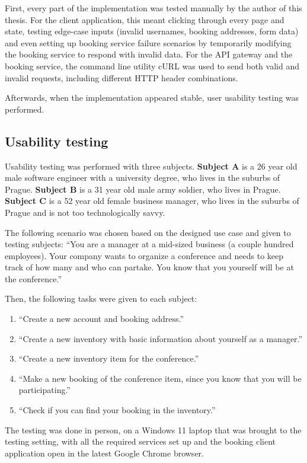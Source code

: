 First, every part of the implementation was tested manually by the author of this thesis. For the client application, this meant clicking through every page and state, testing edge-case inputs (invalid usernames, booking addresses, form data) and even setting up booking service failure scenarios by temporarily modifying the booking service to respond with invalid data. For the API gateway and the booking service, the command line utility cURL was used to send both valid and invalid requests, including different HTTP header combinations.

Afterwards, when the implementation appeared stable, user usability testing was performed. 

\subsection{Usability testing}

Usability testing was performed with three subjects. \textbf{Subject A} is a 26 year old male software engineer with a university degree, who lives in the suburbs of Prague. \textbf{Subject B} is a 31 year old male army soldier, who lives in Prague. \textbf{Subject C} is a 52 year old female business manager, who lives in the suburbs of Prague and is not too technologically savvy.

The following scenario was chosen based on the designed use case and given to testing subjects: \enquote{You are a manager at a mid-sized business (a couple hundred employees). Your company wants to organize a conference and needs to keep track of how many and who can partake. You know that you yourself will be at the conference.}

Then, the following tasks were given to each subject:
\begin{enumerate}
    \item \enquote{Create a new account and booking address.}
    \item \enquote{Create a new inventory with basic information about yourself as a manager.}
    \item \enquote{Create a new inventory item for the conference.}
    \item \enquote{Make a new booking of the conference item, since you know that you will be participating.}
    \item \enquote{Check if you can find your booking in the inventory.}
\end{enumerate}

The testing was done in person, on a Windows 11 laptop that was brought to the testing setting, with all the required services set up and the booking client application open in the latest Google Chrome browser.


